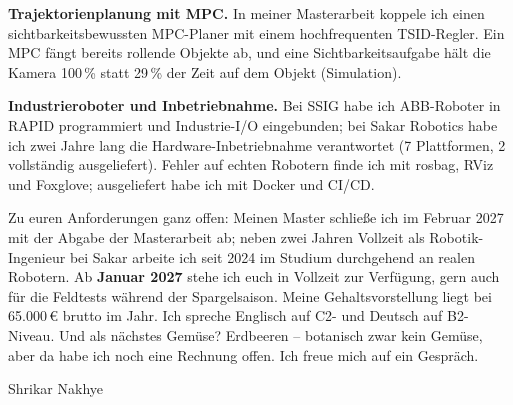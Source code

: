 \documentclass[a4paper,10pt]{article}
\begin{document}
\begin{minipage}{0.97\textwidth}
\vspace{3pt}
\textbf{Trajektorienplanung mit MPC.} In meiner Masterarbeit koppele ich einen sichtbarkeitsbewussten MPC-Planer mit einem hochfrequenten TSID-Regler. Ein MPC fängt bereits rollende Objekte ab, und eine Sichtbarkeitsaufgabe hält die Kamera 100\,\% statt 29\,\% der Zeit auf dem Objekt (Simulation).

\vspace{3pt}
\textbf{Industrieroboter und Inbetriebnahme.} Bei SSIG habe ich ABB-Roboter in RAPID programmiert und Industrie-I/O eingebunden; bei Sakar Robotics habe ich zwei Jahre lang die Hardware-Inbetriebnahme verantwortet (7 Plattformen, 2 vollständig ausgeliefert). Fehler auf echten Robotern finde ich mit rosbag, RViz und Foxglove; ausgeliefert habe ich mit Docker und CI/CD.

\vspace{3pt}
Zu euren Anforderungen ganz offen: Meinen Master schließe ich im Februar 2027 mit der Abgabe der Masterarbeit ab; neben zwei Jahren Vollzeit als Robotik-Ingenieur bei Sakar arbeite ich seit 2024 im Studium durchgehend an realen Robotern. Ab \textbf{Januar 2027} stehe ich euch in Vollzeit zur Verfügung, gern auch für die Feldtests während der Spargelsaison. Meine Gehaltsvorstellung liegt bei 65.000\,€ brutto im Jahr. Ich spreche Englisch auf C2- und Deutsch auf B2-Niveau. Und als nächstes Gemüse? Erdbeeren -- botanisch zwar kein Gemüse, aber da habe ich noch eine Rechnung offen. Ich freue mich auf ein Gespräch.

\vspace{8pt}

\cvclosing

\vspace{6pt}
Shrikar Nakhye

\end{minipage}
\end{document}
